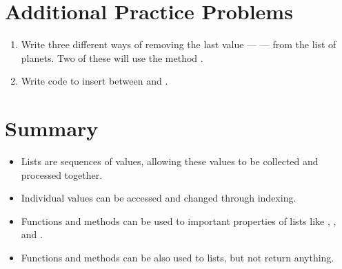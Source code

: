 \documentclass[letterpaper,10pt,english]{sphinxmanual}
\begin{document}
\section{Additional Practice Problems}
\label{\detokenize{lecture_notes/lec08_lists1:additional-practice-problems}}\begin{enumerate}
\def\theenumi{\arabic{enumi}}
\def\labelenumi{\theenumi .}
\makeatletter\def\p@enumii{\p@enumi \theenumi .}\makeatother
\item {} 
Write three different ways of removing the last value —  —
from the list of planets. Two of these will use the method .

\item {} 
Write code to insert  between  and
.

\end{enumerate}


\section{Summary}
\label{\detokenize{lecture_notes/lec08_lists1:summary}}\begin{itemize}
\item {} 
Lists are sequences of values, allowing these values to be collected
and processed together.

\item {} 
Individual values can be accessed and changed through indexing.

\item {} 
Functions and methods can be used to  important properties
of lists like , , and .

\item {} 
Functions and methods can be also used to  lists, but not
return anything.

\end{itemize}
\end{document}
